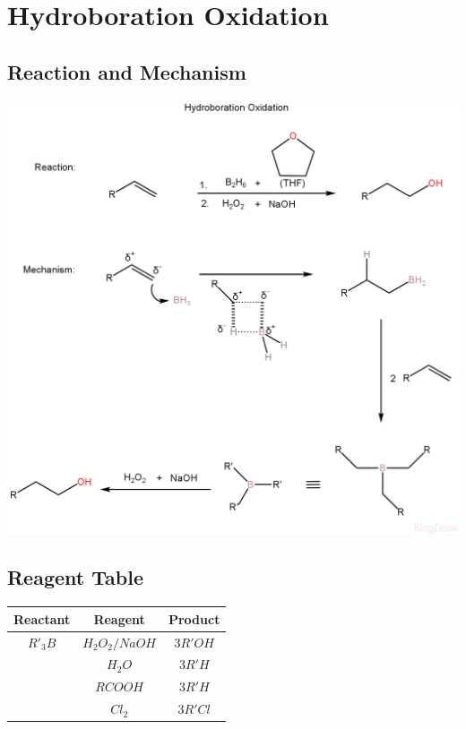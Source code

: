 \documentclass{article}
\begin{document}
\section{Hydroboration Oxidation}
\subsection{Reaction and Mechanism}
\includegraphics[scale=0.25]{hbo_1722684553916.JPEG}
\subsection{Reagent Table}
\begin{tabular}{|c|c | c|}
    \hline
    Reactant  & Reagent           & Product  \\
    \hline
    $R'_{3}B$ & $H_{2}O_{2}/NaOH$ & $3 R'OH$ \\
              & $H_{2}O$          & $3R'H$   \\
              & $RCOOH$           & $3R'H$   \\
              & $Cl_{2}$          & $3R'Cl$  \\
    \hline
\end{tabular}
\end{document}
